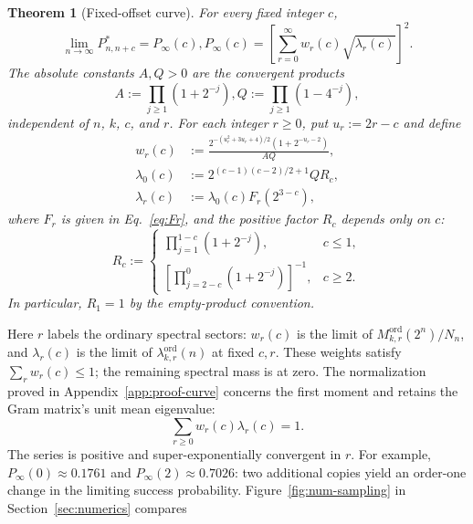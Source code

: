 \documentclass[journal,twocolumn]{IEEEtran}
\newtheorem{theorem}{Theorem}
\theoremstyle{definition}
\theoremstyle{plain}
\newcommand{\Ord}{\mathrm{ord}}
\begin{document}
\begin{theorem}[Fixed-offset curve]
\label{thm:curve}
For every fixed integer $c$,
\begin{equation}
 \lim_{n\to\infty}P^*_{n,n+c}=P_\infty(c),
 P_\infty(c)=\left[\sum_{r=0}^{\infty}
 w_r(c)\sqrt{\lambda_r(c)}\right]^2 .
 \label{eq:curve}
\end{equation}
The absolute constants $A,Q>0$ are the convergent products
\begin{equation}
 A:=\prod_{j\geq1}(1+2^{-j}),
 Q:=\prod_{j\geq1}(1-4^{-j}),
 \label{eq:AQ}
\end{equation}
independent of $n$, $k$, $c$, and $r$.
For each integer $r\geq0$, put $u_r:=2r-c$ and define
\begin{align}
  w_r(c)&:=\frac{2^{-(u_r^2+3u_r+4)/2}(1+2^{-u_r-2})}{AQ},\label{eq:weight}\\
 \lambda_0(c)&:=2^{(c-1)(c-2)/2+1}QR_c,\label{eq:lambda0}\\
 \lambda_r(c)&:=\lambda_0(c)F_r(2^{3-c}),\label{eq:lambdar}
\end{align}
where $F_r$ is given in Eq.~\eqref{eq:Fr}, and the positive factor $R_c$
depends only on $c$:
\begin{equation}
 R_c:=
 \begin{cases}
 \displaystyle\prod_{j=1}^{1-c}(1+2^{-j}),&c\leq1,\\[1ex]
 \displaystyle\left[\prod_{j=2-c}^{0}(1+2^{-j})\right]^{-1},&c\geq2.
 \end{cases}
 \label{eq:Rc}
\end{equation}
In particular, $R_1=1$ by the empty-product convention.

\end{theorem}
Here $r$ labels the ordinary spectral sectors: $w_r(c)$ is the limit of
$M^{\Ord}_{k,r}(2^n)/N_n$, and $\lambda_r(c)$ is the limit of
$\lambda^{\Ord}_{k,r}(n)$ at fixed $c,r$.  These weights satisfy
$\sum_rw_r(c)\leq1$; the
remaining spectral mass is at zero.  The normalization proved in
Appendix~\ref{app:proof-curve} concerns the first moment and retains the Gram
matrix's unit mean eigenvalue:
\begin{equation}
 \sum_{r\geq0}w_r(c)\lambda_r(c)=1.
 \label{eq:normalization}
\end{equation} The series is positive and super-exponentially convergent in $r$.
For example, $P_\infty(0)\approx0.1761$ and
$P_\infty(2)\approx0.7026$: two additional copies yield an order-one
change in the limiting success probability.
Figure~\ref{fig:num-sampling} in Section~\ref{sec:numerics} compares
\end{document}
